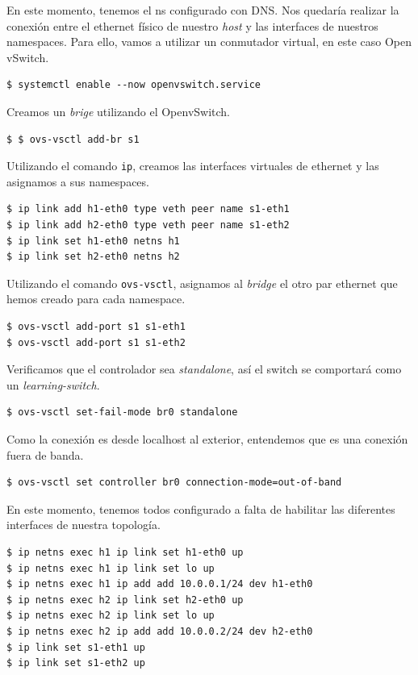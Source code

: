 \documentclass[a4paper, oneside, 12pt]{book}
\begin{document}
	\noindent En este momento, tenemos el ns configurado con DNS. Nos quedaría realizar la conexión entre el ethernet físico de nuestro \textit{host} y las interfaces de nuestros namespaces. Para ello, vamos a utilizar un conmutador virtual, en este caso Open vSwitch.
	\begin{verbatim}
$ systemctl enable --now openvswitch.service
	\end{verbatim}

	\noindent Creamos un \textit{brige} utilizando el OpenvSwitch.
	\begin{verbatim}
$ $ ovs-vsctl add-br s1
	\end{verbatim}

	\noindent Utilizando el comando \texttt{ip}, creamos las interfaces virtuales de ethernet y las asignamos a sus namespaces.
	\begin{verbatim}
$ ip link add h1-eth0 type veth peer name s1-eth1
$ ip link add h2-eth0 type veth peer name s1-eth2
$ ip link set h1-eth0 netns h1
$ ip link set h2-eth0 netns h2
	\end{verbatim}

	\pagebreak
	
	\noindent Utilizando el comando \texttt{ovs-vsctl}, asignamos al \textit{bridge} el otro par ethernet que hemos creado para cada namespace.
	\begin{verbatim}
$ ovs-vsctl add-port s1 s1-eth1
$ ovs-vsctl add-port s1 s1-eth2
	\end{verbatim}

	\noindent Verificamos que el controlador sea \textit{standalone}, así el switch se comportará como un \textit{learning-switch}.
	\begin{verbatim}
$ ovs-vsctl set-fail-mode br0 standalone
	\end{verbatim}

	\noindent Como la conexión es desde localhost al exterior, entendemos que es una conexión fuera de banda.
	\begin{verbatim}
$ ovs-vsctl set controller br0 connection-mode=out-of-band
	\end{verbatim}

	\noindent En este momento, tenemos todos configurado a falta de habilitar las diferentes interfaces de nuestra topología.
	\begin{verbatim}
$ ip netns exec h1 ip link set h1-eth0 up
$ ip netns exec h1 ip link set lo up
$ ip netns exec h1 ip add add 10.0.0.1/24 dev h1-eth0
$ ip netns exec h2 ip link set h2-eth0 up
$ ip netns exec h2 ip link set lo up
$ ip netns exec h2 ip add add 10.0.0.2/24 dev h2-eth0
$ ip link set s1-eth1 up
$ ip link set s1-eth2 up
	\end{verbatim}
\end{document}
